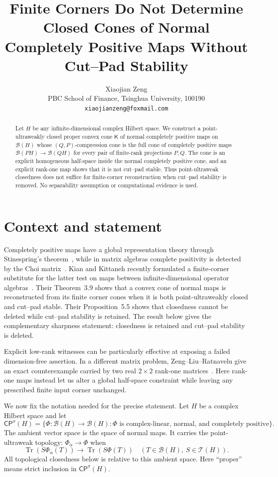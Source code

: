 \documentclass[11pt]{article}
\title{Finite Corners Do Not Determine Closed Cones of Normal Completely
Positive Maps Without Cut--Pad Stability}
\author{Xiaojian Zeng\\
PBC School of Finance, Tsinghua University, 100190\\
\texttt{xiaojianzeng@foxmail.com}}
\date{}
\newcommand{\B}{\mathcal B}
\newcommand{\T}{\mathcal T}
\newcommand{\CP}{\mathsf{CP}}
\newcommand{\Kcone}{\mathsf K}
\newcommand{\Tr}{\operatorname{Tr}}
\begin{document}
\maketitle

\begin{abstract}
Let $H$ be any infinite-dimensional complex Hilbert space.  We construct a
point-ultraweakly closed proper convex cone $\Kcone$ of normal completely
positive maps on $\B(H)$ whose $(Q,P)$-compression cone is the full cone of
completely positive maps $\B(PH)\to\B(QH)$ for every pair of finite-rank
projections $P,Q$.  The cone is an explicit homogeneous half-space inside the
normal completely positive cone, and an explicit rank-one map shows that it is
not cut--pad stable.  Thus point-ultraweak closedness does not suffice for
finite-corner reconstruction when cut--pad stability is removed.  No
separability assumption or computational evidence is used.
\end{abstract}

\section{Context and statement}

Completely positive maps have a global representation theory through
Stinespring's theorem~\cite{Stinespring1955}, while in matrix algebras complete
positivity is detected by the Choi matrix~\cite{Choi1975}.  Kian and Kittaneh
recently formulated a finite-corner substitute for the latter test on maps
between infinite-dimensional operator algebras~\cite{KianKittaneh2026}.  Their
Theorem~3.9 shows that a convex cone of normal maps is reconstructed from its
finite corner cones when it is both point-ultraweakly closed and cut--pad
stable.  Their Proposition~5.5 shows that closedness cannot be deleted while
cut--pad stability is retained.  The result below gives the complementary
sharpness statement: closedness is retained and cut--pad stability is deleted.

Explicit low-rank witnesses can be particularly effective at exposing a
failed dimension-free assertion.  In a different matrix problem,
Zeng--Liu--Ratnavelu give an exact counterexample carried by two real
$2\times2$ rank-one matrices~\cite{ZengLiuRatnavelu2026}.  Here rank-one maps
instead let us alter a global half-space constraint while leaving any
prescribed finite input corner unchanged.

We now fix the notation needed for the precise statement.  Let $H$ be a
complex Hilbert space and let
\[
 \CP^\sigma(H)=\{\Phi:\B(H)\to\B(H):
     \Phi\text{ is complex-linear, normal, and completely positive}\}.
\]
The ambient vector space is the space of normal maps.  It carries the
point-ultraweak topology: $\Phi_\alpha\to\Phi$ when
\[
 \Tr(S\Phi_\alpha(T))\longrightarrow \Tr(S\Phi(T))
 \quad(T\in\B(H),\ S\in\T(H)).
\]
All topological closedness below is relative to this ambient space.
Here ``proper'' means strict inclusion in $\CP^\sigma(H)$.
\end{document}
